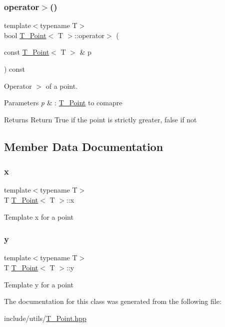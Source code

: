 \subsubsection{\texorpdfstring{operator$>$()}{operator>()}}
{\footnotesize\ttfamily template$<$typename T$>$ \\
bool \hyperlink{classT__Point}{T\+\_\+\+Point}$<$ T $>$\+::operator$>$ (\begin{DoxyParamCaption}\item[{const \hyperlink{classT__Point}{T\+\_\+\+Point}$<$ T $>$ \&}]{p }\end{DoxyParamCaption}) const\hspace{0.3cm}{\ttfamily [inline]}}



Operator $>$ of a point. 


\begin{DoxyParams}{Parameters}
{\em p} & \+: \hyperlink{classT__Point}{T\+\_\+\+Point} to comapre \\
\hline
\end{DoxyParams}
\begin{DoxyReturn}{Returns}
Return True if the point is strictly greater, false if not 
\end{DoxyReturn}


\subsection{Member Data Documentation}
\mbox{\label{classT__Point_a45cc1c670a8d9bc786a38428cdce4bd2}} 
\subsubsection{\texorpdfstring{x}{x}}
{\footnotesize\ttfamily template$<$typename T$>$ \\
T \hyperlink{classT__Point}{T\+\_\+\+Point}$<$ T $>$\+::x}

Template x for a point \mbox{\label{classT__Point_a28da35a974844bdb3509a90345d3c1f9}} 
\subsubsection{\texorpdfstring{y}{y}}
{\footnotesize\ttfamily template$<$typename T$>$ \\
T \hyperlink{classT__Point}{T\+\_\+\+Point}$<$ T $>$\+::y}

Template y for a point 

The documentation for this class was generated from the following file\+:\begin{DoxyCompactItemize}
\item 
include/utils/\hyperlink{T__Point_8hpp}{T\+\_\+\+Point.\+hpp}\end{DoxyCompactItemize}

